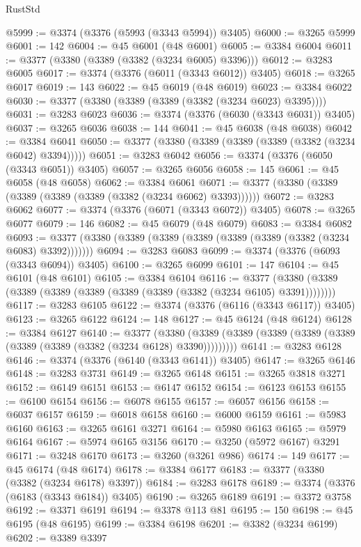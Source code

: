 \begin{lexlean}{RustStd}
\begin{coremodule}
@5999 := @3374 (@3376 (@5993 (@3343 @5994)) @3405)
@6000 := @3265 @5999
@6001 := 142
@6004 := @45 @6001 (@48 @6001)
@6005 := @3384 @6004
@6011 := @3377 (@3380 (@3389 (@3382 (@3234 @6005) @3396)))
@6012 := @3283 @6005
@6017 := @3374 (@3376 (@6011 (@3343 @6012)) @3405)
@6018 := @3265 @6017
@6019 := 143
@6022 := @45 @6019 (@48 @6019)
@6023 := @3384 @6022
@6030 := @3377 (@3380 (@3389 (@3389 (@3382 (@3234 @6023) @3395))))
@6031 := @3283 @6023
@6036 := @3374 (@3376 (@6030 (@3343 @6031)) @3405)
@6037 := @3265 @6036
@6038 := 144
@6041 := @45 @6038 (@48 @6038)
@6042 := @3384 @6041
@6050 := @3377 (@3380 (@3389 (@3389 (@3389 (@3382 (@3234 @6042) @3394)))))
@6051 := @3283 @6042
@6056 := @3374 (@3376 (@6050 (@3343 @6051)) @3405)
@6057 := @3265 @6056
@6058 := 145
@6061 := @45 @6058 (@48 @6058)
@6062 := @3384 @6061
@6071 := @3377 (@3380 (@3389 (@3389 (@3389 (@3389 (@3382 (@3234 @6062) @3393))))))
@6072 := @3283 @6062
@6077 := @3374 (@3376 (@6071 (@3343 @6072)) @3405)
@6078 := @3265 @6077
@6079 := 146
@6082 := @45 @6079 (@48 @6079)
@6083 := @3384 @6082
@6093 := @3377 (@3380 (@3389 (@3389 (@3389 (@3389 (@3389 (@3382 (@3234 @6083) @3392)))))))
@6094 := @3283 @6083
@6099 := @3374 (@3376 (@6093 (@3343 @6094)) @3405)
@6100 := @3265 @6099
@6101 := 147
@6104 := @45 @6101 (@48 @6101)
@6105 := @3384 @6104
@6116 := @3377 (@3380 (@3389 (@3389 (@3389 (@3389 (@3389 (@3389 (@3382 (@3234 @6105) @3391))))))))
@6117 := @3283 @6105
@6122 := @3374 (@3376 (@6116 (@3343 @6117)) @3405)
@6123 := @3265 @6122
@6124 := 148
@6127 := @45 @6124 (@48 @6124)
@6128 := @3384 @6127
@6140 := @3377
    (@3380 (@3389 (@3389 (@3389 (@3389 (@3389 (@3389 (@3389 (@3382 (@3234 @6128) @3390)))))))))
@6141 := @3283 @6128
@6146 := @3374 (@3376 (@6140 (@3343 @6141)) @3405)
@6147 := @3265 @6146
@6148 := @3283 @3731
@6149 := @3265 @6148
@6151 := @3265 @3818 @3271
@6152 := @6149 @6151
@6153 := @6147 @6152
@6154 := @6123 @6153
@6155 := @6100 @6154
@6156 := @6078 @6155
@6157 := @6057 @6156
@6158 := @6037 @6157
@6159 := @6018 @6158
@6160 := @6000 @6159
@6161 := @5983 @6160
@6163 := @3265 @6161 @3271
@6164 := @5980 @6163
@6165 := @5979 @6164
@6167 := @5974 @6165 @3156
@6170 := @3250 (@5972 @6167) @3291
@6171 := @3248 @6170
@6173 := @3260 (@3261 @986)
@6174 := 149
@6177 := @45 @6174 (@48 @6174)
@6178 := @3384 @6177
@6183 := @3377 (@3380 (@3382 (@3234 @6178) @3397))
@6184 := @3283 @6178
@6189 := @3374 (@3376 (@6183 (@3343 @6184)) @3405)
@6190 := @3265 @6189
@6191 := @3372 @3758
@6192 := @3371 @6191
@6194 := @3378 @113 @81
@6195 := 150
@6198 := @45 @6195 (@48 @6195)
@6199 := @3384 @6198
@6201 := @3382 (@3234 @6199)
@6202 := @3389 @3397

\end{coremodule}
\end{lexlean}
